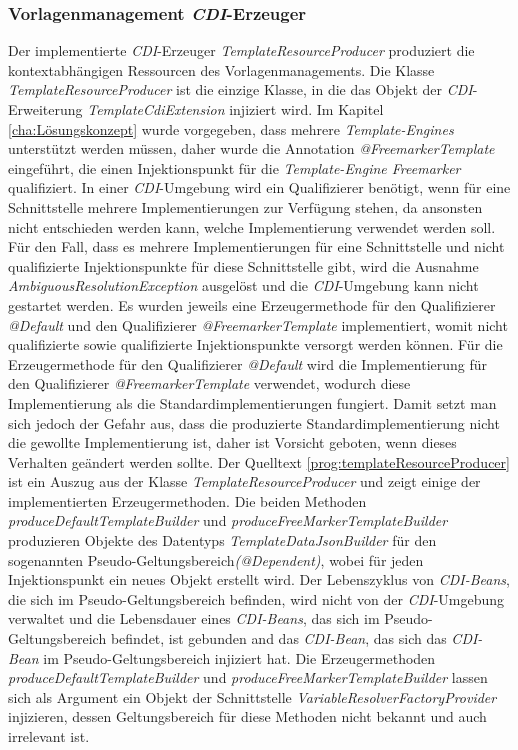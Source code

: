 \subsubsection{Vorlagenmanagement \emph{CDI}-Erzeuger}
Der implementierte \emph{CDI}-Erzeuger \emph{TemplateResourceProducer} produziert die kontextabhängigen Ressourcen des Vorlagenmanagements. Die Klasse \emph{TemplateResourceProducer} ist die einzige Klasse, in die das Objekt der \emph{CDI}-Erweiterung \emph{TemplateCdiExtension} injiziert wird. 
\newline
\newline
Im Kapitel \ref{cha:Lösungskonzept} wurde vorgegeben, dass mehrere \emph{Template-Engines} unterstützt werden müssen, daher wurde die Annotation \emph{@FreemarkerTemplate} eingeführt, die einen Injektionspunkt für die \emph{Template-Engine Freemarker} qualifiziert. In einer \emph{CDI}-Umgebung wird ein Qualifizierer benötigt, wenn für eine Schnittstelle mehrere Implementierungen zur Verfügung stehen, da ansonsten nicht entschieden werden kann, welche Implementierung verwendet werden soll. Für den Fall, dass es mehrere Implementierungen für eine Schnittstelle und nicht qualifizierte Injektionspunkte für diese Schnittstelle gibt, wird die Ausnahme \emph{AmbiguousResolutionException} ausgelöst und die \emph{CDI}-Umgebung kann nicht gestartet werden. 
\newline
\newline
Es wurden jeweils eine Erzeugermethode für den Qualifizierer \emph{@Default} und den Qualifizierer \emph{@FreemarkerTemplate} implementiert, womit nicht qualifizierte sowie qualifizierte Injektionspunkte versorgt werden können. Für die Erzeugermethode für den Qualifizierer \emph{@Default} wird die Implementierung für den Qualifizierer \emph{@FreemarkerTemplate} verwendet, wodurch diese Implementierung als die Standardimplementierungen fungiert. Damit setzt man sich jedoch der Gefahr aus, dass die produzierte Standardimplementierung nicht die gewollte Implementierung ist, daher ist Vorsicht geboten, wenn dieses Verhalten geändert werden sollte. 
\newline
\newline
Der Quelltext \ref{prog:templateResourceProducer} ist ein Auszug aus der Klasse \emph{TemplateResourceProducer} und zeigt einige der implementierten Erzeugermethoden. 
\newline
\newline
Die beiden Methoden \emph{produceDefaultTemplateBuilder} und \emph{produceFreeMarkerTemplateBuilder} produzieren Objekte des Datentyps  \emph{TemplateDataJsonBuilder} für den sogenannten Pseudo-Geltungsbereich\emph{(@Dependent)}, wobei für jeden Injektionspunkt ein neues Objekt erstellt wird. Der Lebenszyklus von \emph{CDI-Beans}, die sich im Pseudo-Geltungsbereich befinden, wird nicht von der \emph{CDI}-Umgebung verwaltet und die Lebensdauer eines \emph{CDI-Beans}, das sich im Pseudo-Geltungsbereich befindet, ist gebunden and das \emph{CDI-Bean}, das sich das \emph{CDI-Bean} im Pseudo-Geltungsbereich injiziert hat. Die Erzeugermethoden \emph{produceDefaultTemplateBuilder} und \emph{produceFreeMarkerTemplateBuilder} lassen sich als Argument ein Objekt der Schnittstelle \emph{VariableResolverFactoryProvider} injizieren, dessen Geltungsbereich für diese Methoden nicht bekannt und auch irrelevant ist.
